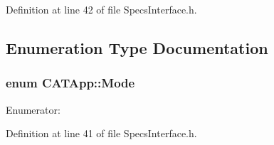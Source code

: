 Definition at line 42 of file SpecsInterface.h.

\subsection{Enumeration Type Documentation}
\hypertarget{namespaceCATApp_addde02095b318dd29aad22bf91fbf5c7}{
\subsubsection[{Mode}]{\setlength{\rightskip}{0pt plus 5cm}enum {\bf CATApp::Mode}}}
\label{namespaceCATApp_addde02095b318dd29aad22bf91fbf5c7}
\begin{Desc}
\item[Enumerator: ]\par
\begin{description}
\item[{\em 
\hypertarget{namespaceCATApp_addde02095b318dd29aad22bf91fbf5c7aa5eeb9b5908cf99ffe6cd93cf235579d}{
BUS}
\label{namespaceCATApp_addde02095b318dd29aad22bf91fbf5c7aa5eeb9b5908cf99ffe6cd93cf235579d}
}]\item[{\em 
\hypertarget{namespaceCATApp_addde02095b318dd29aad22bf91fbf5c7af0a8d8add7a4fb23e99e6ea6e09e5a59}{
I2C}
\label{namespaceCATApp_addde02095b318dd29aad22bf91fbf5c7af0a8d8add7a4fb23e99e6ea6e09e5a59}
}]\end{description}
\end{Desc}



Definition at line 41 of file SpecsInterface.h.


